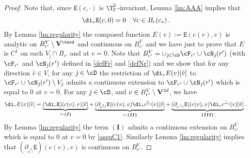 \documentclass[11pt,a4paper,reqno]{article}
\numberwithin{equation}{section}
\theoremstyle{definition}
\begin{document}
    \begin{proof}
    Note that, since ${\mathtt E}(c,\cdot)$ is $\T^2_\Gamma$-invariant,   Lemma \ref{lm:AAA} 
    implies that 
    \begin{equation}\label{assuC1 2}
        \di_v {\mathtt E}(c,0)=0\quad \forall c\in B_{r}(c_*)\, .
    \end{equation}
        By Lemma \ref{lm:regularity} the 
        composed function  $E(v) :=  {\mathtt E} (c(v),v)$ is analytic on $B_{r'}^V\setminus {\bf V}^{\twod}$ and 
        continuous on  $B_{r'}^V$ 
        and we 
         have just to prove that $E  $ is $ C^1 $  on each 
        $ V_{\hat \jmath} \cap B_{r' }$ and  at $ v = 0 $.   
        Note that 
         $B_{r'}^V = \cup_{\hat \jmath\in \cD} \cF_{r'}\cup \cN_{\hat \jmath}(r') $ (with $\cF_{r'}$ and $\cN_{\hat \jmath}(r')$  defined in \eqref{defFr} and \eqref{defNr})
and we         
        show that for any direction $\hat v\in V$, for any $\hat \jmath \in \cD$ the restriction of $\di_v E(v)[\hat v]$ to $\cF_{r'}\cup \cN_{\hat \jmath}(r')\setminus V_{\hat \jmath}$ admits a continuous extension to $\cF_{r'}\cup \cN_{\hat \jmath}(r')$ which is equal to $0$ at $ v = 0$.
For any $ {\hat \jmath} \in \cD $, and  $v\in B_{r'}^V\setminus {\bf V}^{2d}$, we have 
        \begin{align*}\label{eq:dE(v)[hat v]}
        \di_v E(v)[\hat v] =
        \underbrace{(\di_v {\mathtt E}) (c(v),v)[\hat v]}_{=: \boldsymbol{(I)}} +
        \underbrace{(\partial_{c^{\parallel_{\hat \jmath}}} {\mathtt E}) (c(v),v)\di_v c^{\parallel_{\hat \jmath}}(v)[\hat v]}_{=: \boldsymbol{(II)} } +\underbrace{(\partial_{c^{\bot_{\hat \jmath}}}{\mathtt E}) (c(v),v)\di_v c^{\bot_{\hat \jmath}}(v)[\hat v]}_{\boldsymbol{(III)}} \, . 
        \end{align*}
        By  Lemma \ref{lm:regularity} the term $\boldsymbol{(I)}$ admits a continuous extension on $B_{r'}^V$ which is equal to $0$ at $v=0$  by \eqref{assuC1}.
        Similarly Lemma \ref{lm:regularity} implies  that  $(\partial_{c^{\parallel_{\hat \jmath}}}{\mathtt E})(c(v),v)$ is continuous on $B_{r'}^V$.

\end{proof}
\end{document}
